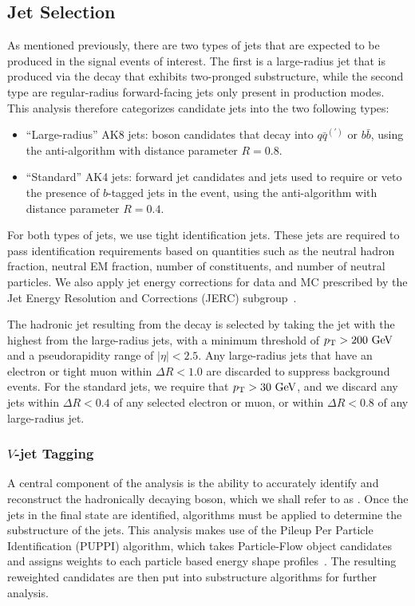 \subsection{Jet Selection}
\label{subsec:jetSelect}

As mentioned previously, there are two types of jets that are expected to be produced in the signal events of interest.
The first is a large-radius jet that is produced via the \VorH decay that exhibits two-pronged substructure, while the second type are regular-radius forward-facing jets only present in \VBF production modes.
This analysis therefore categorizes candidate jets into the two following types:
\begin{itemize}
  \item ``Large-radius'' AK8 jets: \VorH boson candidates that decay into $q\bar{q}^{(\prime)}$ or $b\bar{b}$, using the anti-\kt algorithm with distance parameter $R=0.8$.
  \item ``Standard'' AK4 jets: \VBF forward jet candidates and jets used to require or veto the presence of $b$-tagged jets in the event, using the anti-\kt algorithm with distance parameter $R=0.4$.
\end{itemize}

For both types of jets, we use tight identification jets.
These jets are required to pass identification requirements based on quantities such as the neutral hadron fraction, neutral EM fraction, number of constituents, and number of neutral particles.
We also apply jet energy corrections for data and MC prescribed by the Jet Energy Resolution and Corrections (JERC) subgroup~\cite{Khachatryan:2016kdb}.

The hadronic jet resulting from the \VorH decay is selected by taking the jet with the highest \pt from the large-radius jets, with a minimum threshold of $\pt>200\unit{GeV}$ and a pseudorapidity range of $|\eta|<2.5$.
Any large-radius jets that have an electron or tight muon within $\Delta R<1.0$ are discarded to suppress background events.
For the standard jets, we require that $\pt>30\unit{GeV}$, and we discard any jets within $\Delta R<0.4$ of any selected electron or muon, or within $\Delta R<0.8$ of any large-radius jet.

\subsubsection{$V$-jet Tagging}

A central component of the analysis is the ability to accurately identify and reconstruct the hadronically decaying \VorH boson, which we shall refer to as \Vhad.
Once the jets in the final state are identified, algorithms must be applied to determine the substructure of the jets.
This analysis makes use of the Pileup Per Particle Identification (PUPPI) algorithm, which takes Particle-Flow object candidates and assigns weights to each particle based energy shape profiles~\cite{Bertolini_2014}.
The resulting reweighted candidates are then put into substructure algorithms for further analysis.

